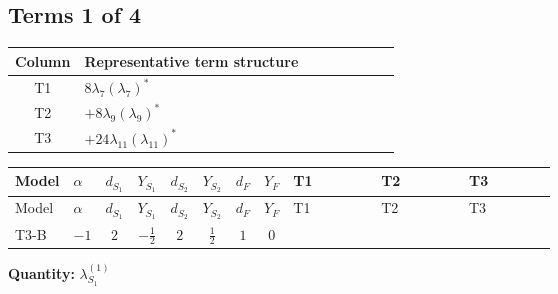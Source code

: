 \documentclass[8pt]{article}
\begin{document}
\begin{landscape}
\subsection*{Terms 1 of 4}
\begin{center}
\begin{tabular}{@{}c >{\raggedright\arraybackslash}p{0.82\linewidth}@{}}
\toprule
Column & Representative term structure \\
\midrule
T1 & \(\displaystyle 8 {\lambda_{7}} \left({\lambda_{7}}\right)^{*}\) \\
\midrule
T2 & \(\displaystyle +8 {\lambda_{9}} \left({\lambda_{9}}\right)^{*}\) \\
\midrule
T3 & \(\displaystyle +24 {\lambda_{11}} \left({\lambda_{11}}\right)^{*}\) \\
\midrule
\bottomrule
\end{tabular}
\end{center}
\smallskip
\tiny
\begin{longtable}{@{}llcccccc >{\raggedright\arraybackslash}p{0.21\linewidth} >{\raggedright\arraybackslash}p{0.21\linewidth} >{\raggedright\arraybackslash}p{0.21\linewidth}@{}}
\toprule
Model & $\alpha$ & $d_{S_1}$ & $Y_{S_1}$ & $d_{S_2}$ & $Y_{S_2}$ & $d_F$ & $Y_F$ & T1 & T2 & T3 \\
\midrule
\endfirsthead
\toprule
Model & $\alpha$ & $d_{S_1}$ & $Y_{S_1}$ & $d_{S_2}$ & $Y_{S_2}$ & $d_F$ & $Y_F$ & T1 & T2 & T3 \\
\midrule
\endhead
T3-B & $-1$ & $2$ & $-\frac{1}{2}$ & $2$ & $\frac{1}{2}$ & $1$ & $0$ & \scriptsize\adjustbox{max width=\linewidth}{$\begin{gathered} 8 {\lambda_{7}} \left({\lambda_{7}}\right)^{*}\end{gathered}$} & \scriptsize\adjustbox{max width=\linewidth}{$\begin{gathered} +8 {\lambda_{9}} \left({\lambda_{9}}\right)^{*}\end{gathered}$} & \scriptsize\adjustbox{max width=\linewidth}{$\begin{gathered} +24 {\lambda_{11}} \left({\lambda_{11}}\right)^{*}\end{gathered}$} \\
\midrule
\bottomrule
\end{longtable}
\clearpage
\noindent\textbf{Quantity: }$\lambda_{S_1}^{(1)}$\par\smallskip

\end{landscape}
\end{document}
